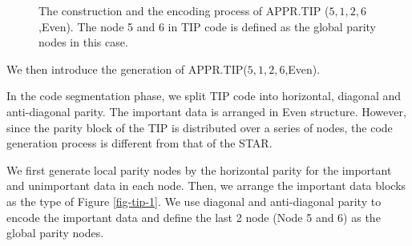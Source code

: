 \documentclass[sigconf]{acmart}
\begin{document}
\begin{figure}[ht]
\caption{The construction and the encoding process of APPR.TIP ($5,1,2,6$,Even). The node 5 and 6 in TIP code is defined as the global parity nodes in this case.}
\label{fig-ap-TIP}
\end{figure}

We then introduce the generation of APPR.TIP($5,1,2,6$,Even).

In the code segmentation phase, we split TIP code into horizontal, diagonal and anti-diagonal parity. The important data is arranged in Even structure. However, since the parity block of the TIP is distributed over a series of nodes, the code generation process is different from that of the STAR.

We first generate local parity nodes by the horizontal parity for the important and unimportant data in each node. Then, we arrange the important data blocks as the type of Figure \ref{fig-tip-1}.
We use diagonal and anti-diagonal parity to encode the important data and define the last 2 node (Node 5 and 6) as the global parity nodes.
\end{document}
